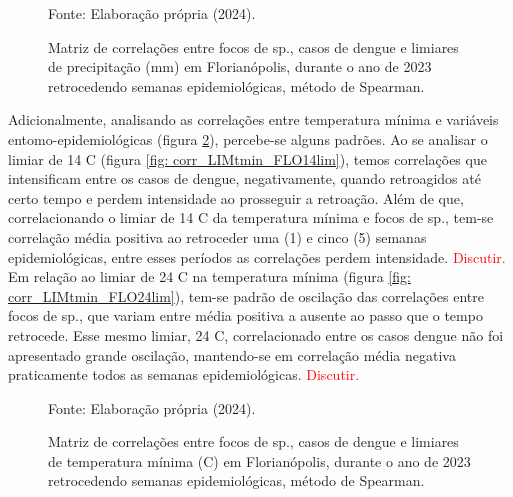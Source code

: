 \documentclass[
	12pt,				%
	openright,			%
	oneside,			%
	a4paper,			%
	english,			%
	french,				%
	spanish,			%
	brazil				%
	dvipsnames, table]{abntex2}
\begin{document}
\begin{figure}[htbp]
    \begin{center}
    \caption{Matriz de correlações entre focos de  sp., casos de dengue e limiares de precipitação (mm) em Florianópolis, durante o ano de 2023 retrocedendo semanas epidemiológicas, método de Spearman.}
    \label{fig: matriz_corr_LIMprec_FLO}
        \hfill
    \end{center}
    \small{Fonte: Elaboração própria (2024).}
\end{figure}

\indent Adicionalmente, analisando as correlações entre temperatura mínima e variáveis entomo-epidemiológicas (figura \ref{fig: matriz_corr_LIMtmin_FLO}), percebe-se alguns padrões. Ao se analisar o limiar de 14 C (figura \ref{fig: corr_LIMtmin_FLO14lim}), temos correlações que intensificam entre os casos de dengue, negativamente, quando retroagidos até certo tempo e perdem intensidade ao prosseguir a retroação. Além de que, correlacionando o limiar de 14 C da temperatura mínima e focos de  sp., tem-se correlação média positiva ao retroceder uma (1) e cinco (5) semanas epidemiológicas, entre esses períodos as correlações perdem intensidade. \textcolor{red}{Discutir.} Em relação ao limiar de 24 C na temperatura mínima (figura \ref{fig: corr_LIMtmin_FLO24lim}), tem-se padrão de oscilação das correlações entre focos de  sp., que variam entre média positiva a ausente ao passo que o tempo retrocede. Esse mesmo limiar, 24 C, correlacionado entre os casos dengue não foi apresentado grande oscilação, mantendo-se em correlação média negativa praticamente todos as semanas epidemiológicas. \textcolor{red}{Discutir.}

\begin{figure}[htbp]
    \begin{center}
    \caption{Matriz de correlações entre focos de  sp., casos de dengue e limiares de temperatura mínima (C) em Florianópolis, durante o ano de 2023 retrocedendo semanas epidemiológicas, método de Spearman.}
    \label{fig: matriz_corr_LIMtmin_FLO}
        \hfill
    \end{center}
    \small{Fonte: Elaboração própria (2024).}
\end{figure}
\end{document}
